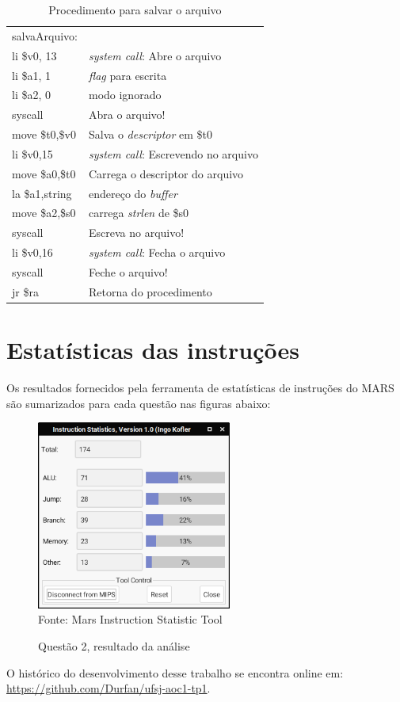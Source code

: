 \documentclass[12pt,a4paper]{article}
\numberwithin{figure}{subsection}
\numberwithin{table}{subsection}
\begin{document}
\begin{table}[H]
	\renewcommand{\arraystretch}{1}
	\centering
	\caption*{Procedimento para salvar o arquivo}
	\label{q2cod:salvafile}
	\begin{tabular}{>{\ttfamily}p{4cm} p{11cm}}
		\toprule
		salvaArquivo:    & \\
		li \$v0, 13      & \textit{system call}: Abre o arquivo \\
		li \$a1, 1       & \textit{flag} para escrita \\
		li \$a2, 0       & modo ignorado \\
		syscall          & Abra o arquivo! \\
		move \$t0,\$v0   & Salva o \textit{descriptor} em \$t0 \\
		\midrule[0.01cm]
		li \$v0,15       & \textit{system call}: Escrevendo no arquivo \\
		move \$a0,\$t0   & Carrega o descriptor do arquivo \\
		la \$a1,string   & endereço do \textit{buffer} \\
		move \$a2,\$s0   & carrega \textit{strlen} de \$s0 \\
		syscall          & Escreva no arquivo! \\
		\midrule[0.01cm]
		li \$v0,16       & \textit{system call}: Fecha o arquivo \\
		syscall          & Feche o arquivo! \\
		jr \$ra          & Retorna do procedimento \\
		\bottomrule
	\end{tabular}
\end{table}

\pagebreak

\section{Estatísticas das instruções}

Os resultados fornecidos pela ferramenta de estatísticas de instruções do MARS são sumarizados para cada questão nas figuras abaixo:  

\begin{figure}[H]
	\centering
	\caption*{Questão 2, resultado da análise}
	\vspace{0.2cm}
	\includegraphics[width=242px]{questao2_stats}
	\\\footnotesize Fonte: Mars Instruction Statistic Tool
\end{figure}

\begin{flushleft}
	
	\vfill
	O histórico do desenvolvimento desse trabalho se encontra online em:\\ \url{https://github.com/Durfan/ufsj-aoc1-tp1}.
\end{flushleft}
\end{document}
